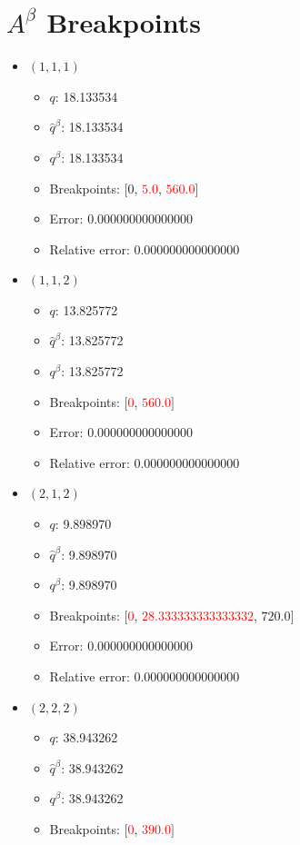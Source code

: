 \documentclass{article}%
\begin{document}
\section{$A^\beta$ Breakpoints}%
\thispagestyle{plain}%
\begin{itemize}%
	\item $(1, 1, 1)$%
	\begin{itemize}%
		\item $q$: 18.133534%
		\item $\hat{q}^\beta$: 18.133534%
		\item $q^\beta$: 18.133534%
		\item Breakpoints: $[$$0$, \textcolor{red}{$5.0$}, \textcolor{red}{$560.0$}$]$%
		\item Error: 0.000000000000000%
		\item Relative error: 0.000000000000000%
	\end{itemize}%
	\item $(1, 1, 2)$%
	\begin{itemize}%
		\item $q$: 13.825772%
		\item $\hat{q}^\beta$: 13.825772%
		\item $q^\beta$: 13.825772%
		\item Breakpoints: $[$\textcolor{red}{$0$}, \textcolor{red}{$560.0$}$]$%
		\item Error: 0.000000000000000%
		\item Relative error: 0.000000000000000%
	\end{itemize}%
	\item $(2, 1, 2)$%
	\begin{itemize}%
		\item $q$: 9.898970%
		\item $\hat{q}^\beta$: 9.898970%
		\item $q^\beta$: 9.898970%
		\item Breakpoints: $[$\textcolor{red}{$0$}, \textcolor{red}{$28.333333333333332$}, $720.0$$]$%
		\item Error: 0.000000000000000%
		\item Relative error: 0.000000000000000%
	\end{itemize}%
	\item $(2, 2, 2)$%
	\begin{itemize}%
		\item $q$: 38.943262%
		\item $\hat{q}^\beta$: 38.943262%
		\item $q^\beta$: 38.943262%
		\item Breakpoints: $[$\textcolor{red}{$0$}, \textcolor{red}{$390.0$}$]$%

\end{itemize}
\end{itemize}
\end{document}
